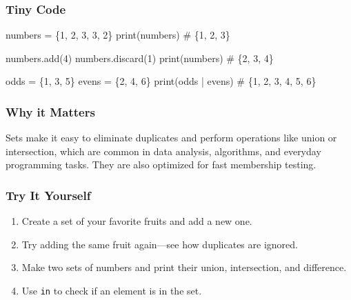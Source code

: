 \documentclass[
  letterpaper,
  DIV=11,
  numbers=noendperiod]{scrreprt}
\newenvironment{Shaded}{\begin{snugshade}}{\end{snugshade}}
\newcommand{\BuiltInTok}[1]{\textcolor[rgb]{0.00,0.23,0.31}{#1}}
\newcommand{\CommentTok}[1]{\textcolor[rgb]{0.37,0.37,0.37}{#1}}
\newcommand{\DecValTok}[1]{\textcolor[rgb]{0.68,0.00,0.00}{#1}}
\newcommand{\NormalTok}[1]{\textcolor[rgb]{0.00,0.23,0.31}{#1}}
\newcommand{\OperatorTok}[1]{\textcolor[rgb]{0.37,0.37,0.37}{#1}}
\providecommand{\tightlist}{%
  \setlength{\itemsep}{0pt}\setlength{\parskip}{0pt}}
\begin{document}
\subsubsection{Tiny Code}\label{tiny-code-25}

\begin{Shaded}
\begin{Highlighting}[]
\NormalTok{numbers }\OperatorTok{=}\NormalTok{ \{}\DecValTok{1}\NormalTok{, }\DecValTok{2}\NormalTok{, }\DecValTok{3}\NormalTok{, }\DecValTok{3}\NormalTok{, }\DecValTok{2}\NormalTok{\}}
\BuiltInTok{print}\NormalTok{(numbers)   }\CommentTok{\# \{1, 2, 3\}}

\NormalTok{numbers.add(}\DecValTok{4}\NormalTok{)}
\NormalTok{numbers.discard(}\DecValTok{1}\NormalTok{)}
\BuiltInTok{print}\NormalTok{(numbers)   }\CommentTok{\# \{2, 3, 4\}}

\NormalTok{odds }\OperatorTok{=}\NormalTok{ \{}\DecValTok{1}\NormalTok{, }\DecValTok{3}\NormalTok{, }\DecValTok{5}\NormalTok{\}}
\NormalTok{evens }\OperatorTok{=}\NormalTok{ \{}\DecValTok{2}\NormalTok{, }\DecValTok{4}\NormalTok{, }\DecValTok{6}\NormalTok{\}}
\BuiltInTok{print}\NormalTok{(odds }\OperatorTok{|}\NormalTok{ evens)   }\CommentTok{\# \{1, 2, 3, 4, 5, 6\}}
\end{Highlighting}
\end{Shaded}

\subsubsection{Why it Matters}\label{why-it-matters-25}

Sets make it easy to eliminate duplicates and perform operations like
union or intersection, which are common in data analysis, algorithms,
and everyday programming tasks. They are also optimized for fast
membership testing.

\subsubsection{Try It Yourself}\label{try-it-yourself-25}

\begin{enumerate}
\def\labelenumi{\arabic{enumi}.}
\tightlist
\item
  Create a set of your favorite fruits and add a new one.
\item
  Try adding the same fruit again---see how duplicates are ignored.
\item
  Make two sets of numbers and print their union, intersection, and
  difference.
\item
  Use \texttt{in} to check if an element is in the set.
\end{enumerate}
\end{document}
